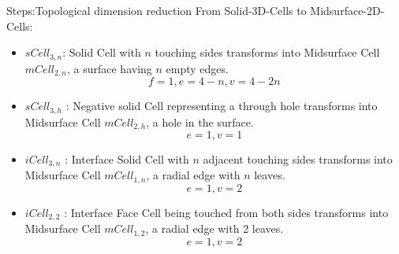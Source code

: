 \begin{frame}{Steps:Topological dimension reduction}
From Solid-3D-Cells to Midsurface-2D-Cells:

\begin{itemize}[noitemsep,label=\textbullet,topsep=2pt,parsep=2pt,partopsep=2pt]

	\item  $sCell_{3,n}$:	Solid Cell with $n$ touching sides transforms into Midsurface Cell   $mCell_{2,n}$, a surface having $n$ empty edges. 
\begin{equation}
f=1,
e=4-n,
v=4-2n
\label{eqn_cellularna}
\end{equation} 

	\item   $sCell_{3,h}$ : Negative solid  Cell representing a through hole transforms into Midsurface Cell  $mCell_{2,h}$, a hole in the surface.
\begin{equation}
e=1, v=1
\label{eqn_cellularah}
\end{equation} 

	\item $iCell_{3,n}$ :	Interface Solid Cell with $n$ adjacent touching sides transforms into Midsurface Cell  $mCell_{1,n}$, a radial edge with $n$ leaves. 
\begin{equation}
e=1,
v=2
\label{eqn_cellulara}
\end{equation}

	\item  $iCell_{2,2}$ :	Interface Face Cell being touched from both sides  transforms into Midsurface Cell  $mCell_{1,2}$, a radial edge with 2 leaves. 
\begin{equation}
e=1,
v=2
\label{eqn_cellularaf}
\end{equation}
\end{itemize}
\end{frame}

